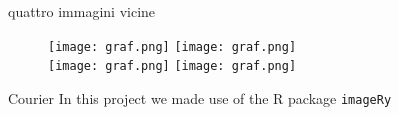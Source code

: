 \documentclass{beamer} %
\begin{document}
\begin{frame}{quattro immagini vicine} %
    \begin{figure}
        \centering
        \texttt{[image: graf.png]} 
        \texttt{[image: graf.png]} \\ %
        \texttt{[image: graf.png]}
        \texttt{[image: graf.png]}
    \end{figure}
\end{frame}

\begin{frame}{Courier}
    In this project we made use of the R package
    \texttt{imageRy} %
\end{frame}
\end{document}
